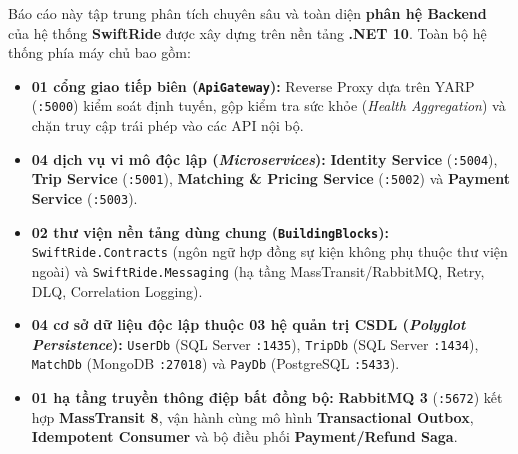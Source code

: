 \documentclass[12pt,a4paper]{article}
\begin{document}
Báo cáo này tập trung phân tích chuyên sâu và toàn diện \textbf{phân hệ Backend} của hệ thống \textbf{SwiftRide} được xây dựng trên nền tảng \textbf{.NET 10}. Toàn bộ hệ thống phía máy chủ bao gồm:
\begin{itemize}[nosep]
    \item \textbf{01 cổng giao tiếp biên (\texttt{ApiGateway}):} Reverse Proxy dựa trên YARP (\texttt{:5000}) kiểm soát định tuyến, gộp kiểm tra sức khỏe (\textit{Health Aggregation}) và chặn truy cập trái phép vào các API nội bộ.
    \item \textbf{04 dịch vụ vi mô độc lập (\textit{Microservices}):} \textbf{Identity Service} (\texttt{:5004}), \textbf{Trip Service} (\texttt{:5001}), \textbf{Matching \& Pricing Service} (\texttt{:5002}) và \textbf{Payment Service} (\texttt{:5003}).
    \item \textbf{02 thư viện nền tảng dùng chung (\texttt{BuildingBlocks}):} \texttt{SwiftRide.Contracts} (ngôn ngữ hợp đồng sự kiện không phụ thuộc thư viện ngoài) và \texttt{SwiftRide.Messaging} (hạ tầng MassTransit/RabbitMQ, Retry, DLQ, Correlation Logging).
    \item \textbf{04 cơ sở dữ liệu độc lập thuộc 03 hệ quản trị CSDL (\textit{Polyglot Persistence}):} \texttt{UserDb} (SQL Server \texttt{:1435}), \texttt{TripDb} (SQL Server \texttt{:1434}), \texttt{MatchDb} (MongoDB \texttt{:27018}) và \texttt{PayDb} (PostgreSQL \texttt{:5433}).
    \item \textbf{01 hạ tầng truyền thông điệp bất đồng bộ:} \textbf{RabbitMQ 3} (\texttt{:5672}) kết hợp \textbf{MassTransit 8}, vận hành cùng mô hình \textbf{Transactional Outbox}, \textbf{Idempotent Consumer} và bộ điều phối \textbf{Payment/Refund Saga}.
\end{itemize}
\end{document}

